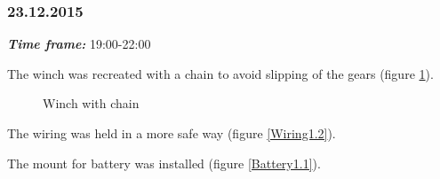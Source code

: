 \subsubsection{23.12.2015}
\textit{\textbf{Time frame:}} 19:00-22:00

The winch was recreated with a chain to avoid slipping of the gears (figure \ref{Winch2.7}).

\begin{figure}[H]
	\begin{minipage}[h]{1\linewidth}
		\caption{Winch with chain}
		\label{Winch2.7}
	\end{minipage}
\end{figure}

The wiring was held in a more safe way (figure \ref{Wiring1.2}).

The mount for battery was installed (figure \ref{Battery1.1}).

